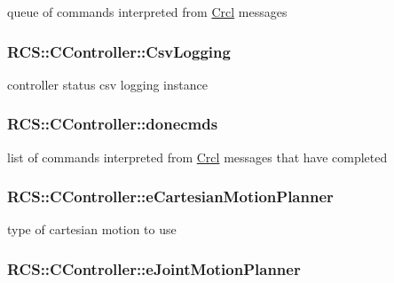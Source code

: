 queue of commands interpreted from \hyperlink{namespaceCrcl}{Crcl} messages \hypertarget{structRCS_1_1CController_a7e21b1156fe37407bae1ba468815206c}{
\subsubsection[{Csv\-Logging}]{ R\-C\-S\-::\-C\-Controller\-::\-Csv\-Logging\hspace{0.3cm}{\ttfamily [static]}}}\label{structRCS_1_1CController_a7e21b1156fe37407bae1ba468815206c}
controller status csv logging instance \hypertarget{structRCS_1_1CController_a093ccebe77526dc736b0ddff70dec0fc}{
\subsubsection[{donecmds}]{ R\-C\-S\-::\-C\-Controller\-::donecmds\hspace{0.3cm}{\ttfamily [static]}}}\label{structRCS_1_1CController_a093ccebe77526dc736b0ddff70dec0fc}
list of commands interpreted from \hyperlink{namespaceCrcl}{Crcl} messages that have completed \hypertarget{structRCS_1_1CController_a4174fd5467045e780fe53bde42e70735}{
\subsubsection[{e\-Cartesian\-Motion\-Planner}]{ R\-C\-S\-::\-C\-Controller\-::e\-Cartesian\-Motion\-Planner}}\label{structRCS_1_1CController_a4174fd5467045e780fe53bde42e70735}
type of cartesian motion to use \hypertarget{structRCS_1_1CController_ad788d0def2101be74b680394bcbc78e7}{
\subsubsection[{e\-Joint\-Motion\-Planner}]{ R\-C\-S\-::\-C\-Controller\-::e\-Joint\-Motion\-Planner}}\label{structRCS_1_1CController_ad788d0def2101be74b680394bcbc78e7}
